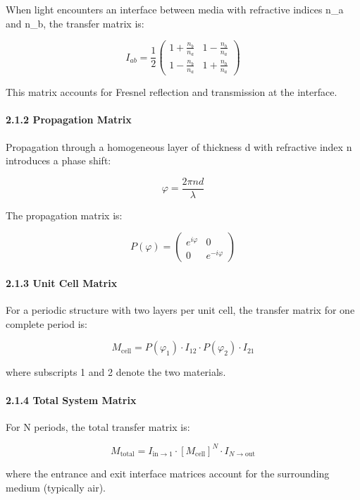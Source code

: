\documentclass[
]{article}
\begin{document}
When light encounters an interface between media with refractive indices
n\_a and n\_b, the transfer matrix is:

\[I_{ab} = \frac{1}{2}\begin{pmatrix} 1 + \frac{n_b}{n_a} & 1 - \frac{n_b}{n_a} \\ 1 - \frac{n_b}{n_a} & 1 + \frac{n_b}{n_a} \end{pmatrix}\]

This matrix accounts for Fresnel reflection and transmission at the
interface.

\paragraph{2.1.2 Propagation Matrix}\label{propagation-matrix}

Propagation through a homogeneous layer of thickness d with refractive
index n introduces a phase shift:

\[\varphi = \frac{2\pi n d}{\lambda}\]

The propagation matrix is:

\[P(\varphi) = \begin{pmatrix} e^{i\varphi} & 0 \\ 0 & e^{-i\varphi} \end{pmatrix}\]

\paragraph{2.1.3 Unit Cell Matrix}\label{unit-cell-matrix}

For a periodic structure with two layers per unit cell, the transfer
matrix for one complete period is:

\[M_{\text{cell}} = P(\varphi_1) \cdot I_{12} \cdot P(\varphi_2) \cdot I_{21}\]

where subscripts 1 and 2 denote the two materials.

\paragraph{2.1.4 Total System Matrix}\label{total-system-matrix}

For N periods, the total transfer matrix is:

\[M_{\text{total}} = I_{\text{in}\to 1} \cdot [M_{\text{cell}}]^N \cdot I_{N\to\text{out}}\]

where the entrance and exit interface matrices account for the
surrounding medium (typically air).
\end{document}

